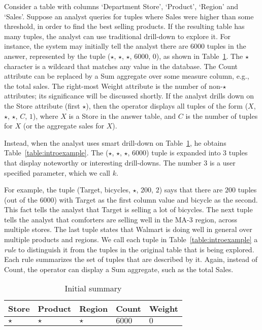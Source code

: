 \begin{example}\label{ex:introexample}
Consider a table with columns `Department Store', `Product', `Region'
and `Sales'. Suppose an analyst queries for tuples
where Sales were higher than some threshold, in order
to find the best selling products.
If the resulting table has many tuples,
the analyst can use traditional drill-down to explore it.
For instance, the system may initially tell the analyst there are
6000 tuples in the answer, represented by the tuple ($\star$, $\star$, $\star$, $6000$, $0$),
as shown in Table~\ref{table:introexample0}.
The $\star$ character is a wildcard that matches any value in the database.
The Count attribute can be replaced by a Sum aggregate over some measure column,
e.g., the total sales.
The right-most Weight attribute is the number of non-$\star$ attributes; 
its significance will be discussed shortly.
If the analyst drills down on the Store attribute (first $\star$),
then the operator displays all tuples of the form ($X$, $\star$, $\star$, $C$, $1$),
where $X$ is a Store in the answer table, and $C$
is the number of tuples for $X$ (or the aggregate sales for $X$).

Instead, when the analyst uses smart drill-down on Table~\ref{table:introexample0},
he obtains Table~\ref{table:introexample}.
The ($\star$, $\star$, $\star$, $6000$) tuple is expanded into $3$ tuples
that display noteworthy or interesting drill-downs.
The number $3$ is a user specified parameter, which we call $k$.

For example, the tuple (Target, bicycles, $\star$, $200$, $2$)
says that there are $200$ tuples (out of the 6000) with
Target as the first column value and bicycle as the second.
This fact tells the analyst that Target is selling a lot of bicycles.
The next tuple tells the analyst that comforters are selling well in
the MA-3 region, across multiple stores. The last tuple
states that Walmart is doing well in general over multiple products and regions.
We call each tuple in Table~\ref{table:introexample} a {\em rule}
to distinguish it from the tuples in the original table that is being explored.
Each rule summarizes the set of tuples that are described by it.
Again, instead of Count, the operator can display a Sum aggregate, such as
the total Sales.

\begin{table}
\scriptsize
\centering
\begin{tabular}{| l | l | l | l | l |}
\hline Store & Product & Region & Count & Weight \\
\hline
$\star$ & $\star$ & $\star$ & $6000$ & $0$ \\ \hline
\end{tabular}
\vspace{-10pt}
\caption{Initial summary}\label{table:introexample0}
\vspace{-15pt}
\end{table}


\end{example}
